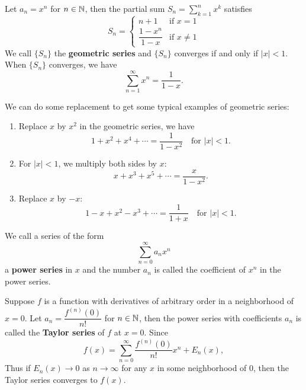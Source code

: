     \begin{theoremenv}
        Let $a_n = x^n$ for $n\in \mathbb{N}$, then the partial sum $\displaystyle S_n = \sum_{k=1}^n x^k$ satisfies
        \[
        S_n = \begin{cases}
            n+1 & \text{if } x=1\\[6pt]
            \dfrac{1-x^{n}}{1-x} & \text{if } x\neq 1
        \end{cases}
        \]
        We call $\{S_n\}$ the \textbf{geometric series} and $\{S_n\}$ converges if and only if $|x|<1$. When $\{S_n\}$ converges, we have $$ \sum_{n=1}^\infty x^n = \frac{1}{1-x}.$$
    \end{theoremenv}
    \begin{exampleenv}
        We can do some replacement to get some typical examples of geometric series:
        \begin{enumerate}[label=(\arabic*)]
            \item Replace $x$ by $x^2$ in the geometric series, we have
            \[
            1+ x^2 + x^4 + \cdots = \frac{1}{1-x^2} \quad \text{for } |x|<1.
            \]
            \item For $|x|<1$, we multiply both sides by $x$:
            \[
            x + x^3 + x^5 + \cdots = \frac{x}{1-x^2}.
            \]
            \item Replace $x$ by $-x$:
            \[
            1 - x + x^2 - x^3 + \cdots = \frac{1}{1+x} \quad \text{for } |x|<1.
            \]
        \end{enumerate}
    \end{exampleenv}
    \begin{definitionenv}\label{def:power-series}
        We call a series of the form
        \[
        \sum_{n=0}^\infty a_n x^n
        \]
        a \textbf{power series} in $x$ and the number $a_n$ is called the coefficient of $x^n$ in the power series.
    \end{definitionenv}
    \begin{exampleenv}
        Suppose $f$ is a function with derivatives of arbitrary order in a neighborhood of $x=0$. Let $a_n = \dfrac{f^{(n)}(0)}{n!}$ for $n\in \mathbb{N}$, then the power series with coefficients $a_n$ is called the \textbf{Taylor series} of $f$ at $x=0$. Since
        \[
        f(x) = \sum_{n=0}^\infty \frac{f^{(n)}(0)}{n!} x^n + E_n(x),
        \]
        Thus if $E_n(x) \to 0$ as $n\to \infty$ for any $x$ in some neighborhood of $0$, then the Taylor series converges to $f(x)$.
    \end{exampleenv}

